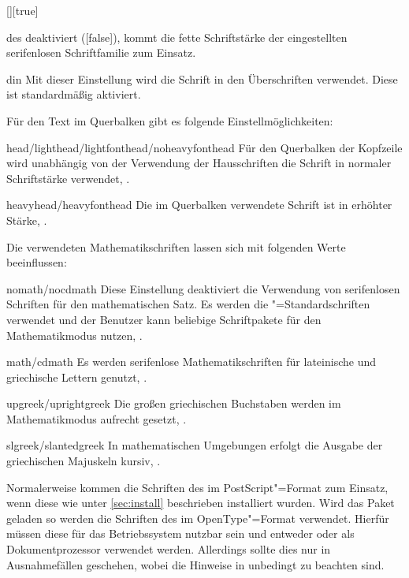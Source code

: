 \begin{Declaration}{[\PSet]}[true]
\begin{values}
  des \CDs deaktiviert ([false]), kommt die fette Schriftstärke 
  der eingestellten serifenlosen Schriftfamilie zum Einsatz.
\item[din]
  Mit dieser Einstellung wird die Schrift \DIN in den Überschriften verwendet. 
  Diese ist standardmäßig aktiviert.
\end{values}
%
Für den Text im Querbalken gibt es folgende Einstellmöglichkeiten:
%
\begin{values}
\item[head/lighthead/lightfonthead/noheavyfonthead]
  Für den Querbalken der Kopfzeile wird unabhängig von der Verwendung der 
  Hausschriften die Schrift \Univers in normaler Schriftstärke verwendet,
  .
\item[heavyhead/heavyfonthead]
  Die im Querbalken verwendete Schrift ist \Univers in erhöhter Stärke, 
  .
\end{values}
%
Die verwendeten Mathematikschriften lassen sich mit folgenden Werte 
beeinflussen:
%
\begin{values}
\item[nomath/nocdmath]  
  Diese Einstellung deaktiviert die Verwendung von serifenlosen Schriften für 
  den mathematischen Satz. Es werden die "=Standardschriften 
  verwendet und der Benutzer kann beliebige Schriftpakete für den 
  Mathematikmodus nutzen, .
\item[math/cdmath]
  Es werden serifenlose Mathematikschriften für lateinische und griechische 
  Lettern genutzt, .
\item[upgreek/uprightgreek]
  Die großen griechischen Buchstaben werden im Mathematikmodus aufrecht gesetzt,
  .
\item[slgreek/slantedgreek]
  In mathematischen Umgebungen erfolgt die Ausgabe der griechischen Majuskeln 
  kursiv, .
\end{values}
%
Normalerweise kommen die Schriften des \CDs im PostScript"=Format zum Einsatz, 
wenn diese wie unter \autoref{sec:install} beschrieben installiert wurden.
Wird das Paket  geladen so werden die Schriften des \CDs im 
OpenType"=Format verwendet. Hierfür müssen diese für das Betriebssystem nutzbar 
sein und entweder  oder  als Dokumentprozessor 
verwendet werden. Allerdings sollte dies nur in Ausnahmefällen geschehen, wobei 
die Hinweise in  unbedingt zu beachten sind.
\end{Declaration}

